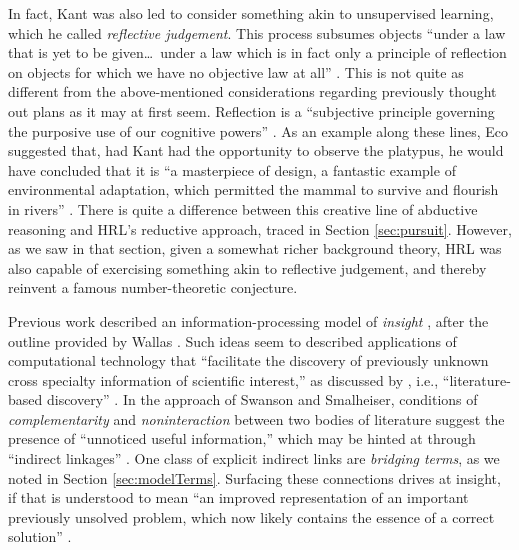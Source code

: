 In fact, Kant was also led to consider something akin to unsupervised learning,
which he called \emph{reflective
judgement}.  This process subsumes objects ``under a law
that is yet to be given\ldots\ under a law which is in fact
only a principle of reflection on objects for which we have no objective
law at all''
\cite[p.~265]{kant1987critique}.
This is not quite as different from the
above-mentioned considerations regarding previously thought out plans
as it may at first seem.
Reflection is
a ``subjective principle governing the purposive use of our cognitive powers'' \cite[p.~266]{kant1987critique}.  As an example along these lines, Eco suggested that,
had Kant had the opportunity to observe the platypus, he
would have concluded that it 
is ``a masterpiece of design, a fantastic example of environmental
adaptation, which permitted the mammal to survive and flourish in rivers''
\cite[p.~93]{eco2000kant}.
There is quite a difference between this creative
line of abductive reasoning and {\sf HRL}'s reductive approach, traced in
Section \ref{sec:pursuit}.  However, as we saw in that section, given
a somewhat richer background theory, {\sf HRL} was also capable of exercising
something akin to reflective judgement, and thereby reinvent
a famous number-theoretic conjecture.


Previous work  described an
information-processing model of \emph{insight} \cite{demystification},
after the outline provided by Wallas \cite{wallas1926art}.
Such ideas seem to described applications of
computational technology that ``facilitate the discovery of
previously unknown cross specialty information of scientific
interest,'' as discussed by
\citet[p.~183]{swanson1997interactive}, i.e.,
``literature-based discovery'' \cite{smalheiser2017rediscovering}.
In the approach of Swanson and Smalheiser, conditions of
\emph{complementarity} and \emph{noninteraction} between
two bodies of literature suggest the presence
of ``unnoticed useful information,'' which may be hinted at through
``indirect linkages'' \cite[pp.~184, 185]{swanson1997interactive}.
One class of explicit indirect links are \emph{bridging terms},
as we noted in Section \ref{sec:modelTerms}.
Surfacing these connections drives at insight,
if that is understood to mean ``an improved representation
of an important previously unsolved problem, which now likely contains
the essence of a correct solution'' \cite[p.~118]{demystification}.

